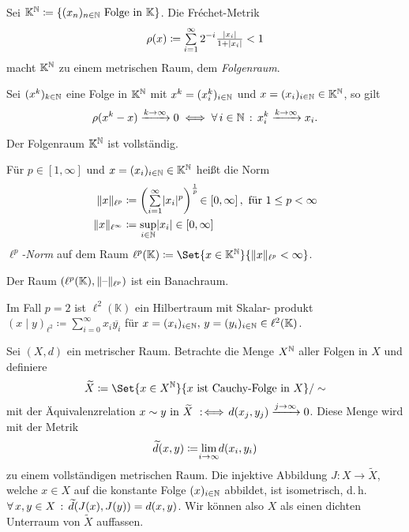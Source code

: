 \documentclass{cheat-sheet}
\newcommand{\K}{\mathbb{K}}
\newcommand{\scp}[2]{\left( #1 \!\mid\! #2 \right)} %
\newcommand{\convWith}[1]{\xrightarrow{#1 \to \infty}} %
\begin{document}
\begin{defn}
  Sei $\K^\N \coloneqq \{ (x_n)_{n \in \N} \text{ Folge in } \K \}$. Die Fréchet-Metrik
    \[ \rho(x) \coloneqq \sum_{i = 1}^\infty 2^{-i} \tfrac{ \abs{x_i} }{ 1 + \abs{x_i} } < 1 \]
  macht $\K^\N$ zu einem metrischen Raum, dem \emph{Folgenraum}.
\end{defn}

\begin{satz}
  Sei $(x^k)_{k \in \mathbb{N}}$ eine Folge in $\K^\N$ mit $x^k = (x^k_i)_{i \in \mathbb{N}}$ und $x = (x_i)_{i \in \N} \in \K^\N$, so gilt
  \[ \rho(x^k - x) \convWith{k} 0 \iff \fa{i \in \N} x_i^k \convWith{k} x_i. \]
\end{satz}

\begin{satz}
  Der Folgenraum $\K^\N$ ist vollständig.
\end{satz}

\begin{defn}
  Für $p \in \left[ 1, \infty \right]$ und $x = (x_i)_{i \in \N} \in \K^\N$ heißt die Norm
  \begin{align*}
    \norm{x}_{\ell^p} &\coloneqq \left( \sum_{i=1}^\infty \abs{x_i}^p \right)^{\frac{1}{p}} \!\in \left[ 0, \infty \right], \text{ für } 1 \leq p < \infty \\
    \norm{x}_{\ell^\infty} &\coloneqq \sup_{i \in \N} \abs{x_i} \in \left[0, \infty\right]
  \end{align*}
  \emph{$\ell^p$-Norm} auf dem Raum $\ell^p(\K) \coloneqq \Set{ x \in \K^\N }{ \norm{x}_{\ell^p} < \infty }$.
\end{defn}

\begin{satz}
  Der Raum $(\ell^p(\K), \norm{\blank}_{\ell^p})$ ist ein Banachraum.
\end{satz}

\begin{bem}
  Im Fall $p {=} 2$ ist $\ell^2(\K)$ ein Hilbertraum mit Skalar- produkt $\scp{x}{y}_{\ell^2} \coloneqq \sum_{i = 0}^\infty x_i \overline{y_i}$ für $x = (x_i)_{i \in \N}, \, y = (y_i)_{i \in \N} \in \ell^2(\K)$.
\end{bem}


\begin{satz}[Vervollständigung]
  Sei $(X, d)$ ein metrischer Raum. Betrachte die Menge $X^{\mathbb{N}}$ aller Folgen in $X$ und definiere
  \[ \widetilde{X} \coloneqq \Set{ x \in X^\N }{ x \text{ ist Cauchy-Folge in } X }/\sim \]
  mit der Äquivalenzrelation $x \sim y \text{ in } \widetilde{X} \!\coloniff\! d(x_j, y_j) \convWith{j} 0$.
  Diese Menge wird mit der Metrik
  \[ \widetilde{d}(x, y) \coloneqq \lim_{\mathclap{i \to \infty}} d(x_i, y_i) \]
  zu einem vollständigen metrischen Raum. Die injektive Abbildung $J : X \to \tilde{X}$, welche $x \in X$ auf die konstante Folge $(x)_{i \in \mathbb{N}}$ abbildet, ist isometrisch, d.\,h.
  $\forall \, {x, y \in X} \,:\, \widetilde{d}(J(x), J(y)) = d(x, y)$.
  Wir können also $X$ als einen dichten Unterraum von $\widetilde{X}$ auffassen.
\end{satz}
\end{document}
